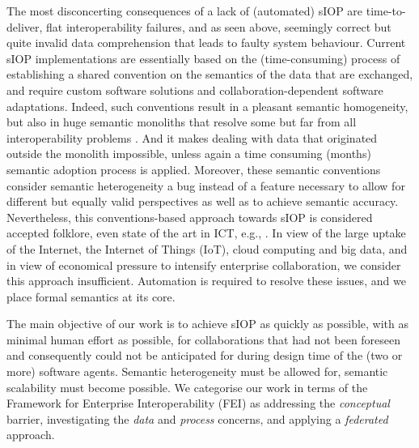 \documentclass[sort&compress,preprint,authoryear,3p,twocolumn]{elsarticle}
\begin{document}
The most disconcerting consequences of a lack of (automated) sIOP are
time-to-deliver, flat interoperability failures, and as seen above,
seemingly correct but quite invalid data comprehension that leads to
faulty system behaviour. Current sIOP implementations are essentially
based on the (time-consuming) process of establishing a shared
convention on the semantics of the data that are exchanged, and require
custom software solutions and collaboration-dependent software
adaptations. Indeed, such conventions result in a pleasant semantic
homogeneity, but also in huge semantic monoliths that resolve some but
far from all interoperability problems \citep{Renner1996}. And it makes
dealing with data that originated outside the monolith impossible,
unless again a time consuming (months) semantic adoption process is
applied. Moreover, these semantic conventions consider semantic
heterogeneity a bug instead of a feature necessary to allow for
different but equally valid perspectives as well as to achieve semantic
accuracy. Nevertheless, this conventions-based approach towards sIOP is
considered accepted folklore, even state of the art in ICT, e.g.,
\citep{Otto2019}. In view of the large uptake of the Internet, the
Internet of Things (IoT), cloud computing and big data, and in view of
economical pressure to intensify enterprise collaboration, we consider
this approach insufficient. Automation is required to resolve these
issues, and we place formal semantics at its core.

The main objective of our work is to achieve sIOP as quickly as
possible, with as minimal human effort as possible, for collaborations
that had not been foreseen and consequently could not be anticipated for
during design time of the (two or more) software agents. Semantic
heterogeneity must be allowed for, semantic scalability must become
possible. We categorise our work in terms of the Framework for
Enterprise Interoperability (FEI) \citep{Chen2017} as addressing the
\emph{conceptual} barrier, investigating the \emph{data} and
\emph{process} concerns, and applying a \emph{federated} approach.
\end{document}
